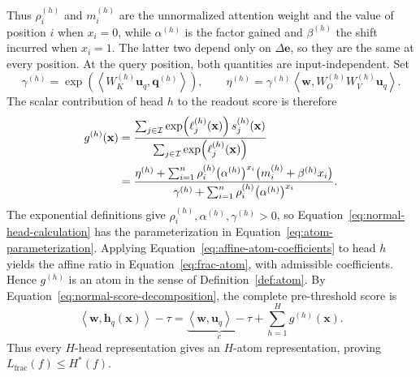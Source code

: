 \documentclass{article}
\theoremstyle{definition}
\theoremstyle{plain}
\newcommand{\hstar}{H^{\ast}}
\begin{document}
Thus $\rho_i^{(h)}$ and $m_i^{(h)}$ are the unnormalized attention weight and the value of position $i$ when $x_i=0$, while $\alpha^{(h)}$ is the factor gained and $\beta^{(h)}$ the shift incurred when $x_i=1$. The latter two depend only on $\Delta\mathbf{e}$, so they are the same at every position. At the query position, both quantities are input-independent. Set
\begin{equation}
\gamma^{(h)}
=\exp\!\left(\left\langle W_K^{(h)}\mathbf{u}_q,\mathbf{q}^{(h)}\right\rangle\right),
\qquad
\eta^{(h)}
=\gamma^{(h)}
\left\langle\mathbf{w},W_O^{(h)}W_V^{(h)}\mathbf{u}_q\right\rangle.
\label{eq:normal-query-parameters}
\end{equation}
The scalar contribution of head $h$ to the readout score is therefore
\begin{align}
g^{(h)}(\mathbf{x})
&=\frac{\sum_{j\in\mathcal{I}}
\exp\!\left(\ell_j^{(h)}(\mathbf{x})\right)s_j^{(h)}(\mathbf{x})}
{\sum_{j\in\mathcal{I}}\exp\!\left(\ell_j^{(h)}(\mathbf{x})\right)}
\notag\\
&=\frac{\eta^{(h)}+\sum_{i=1}^{n}\rho_i^{(h)}
\bigl(\alpha^{(h)}\bigr)^{x_i}
\bigl(m_i^{(h)}+\beta^{(h)}x_i\bigr)}
{\gamma^{(h)}+\sum_{i=1}^{n}\rho_i^{(h)}
\bigl(\alpha^{(h)}\bigr)^{x_i}}.
\label{eq:normal-head-calculation}
\end{align}
The exponential definitions give $\rho_i^{(h)},\alpha^{(h)},\gamma^{(h)}>0$, so Equation~\eqref{eq:normal-head-calculation} has the parameterization in Equation~\eqref{eq:atom-parameterization}. Applying Equation~\eqref{eq:affine-atom-coefficients} to head $h$ yields the affine ratio in Equation~\eqref{eq:frac-atom}, with admissible coefficients. Hence $g^{(h)}$ is an atom in the sense of Definition~\ref{def:atom}. By Equation~\eqref{eq:normal-score-decomposition}, the complete pre-threshold score is
\begin{equation}
\left\langle\mathbf{w},\mathbf{h}_q(\mathbf{x})\right\rangle-\tau
=\underbrace{\left\langle\mathbf{w},\mathbf{u}_q\right\rangle-\tau}_{c}
+\sum_{h=1}^{H}g^{(h)}(\mathbf{x}).
\end{equation}
Thus every $H$-head representation gives an $H$-atom representation, proving $L_{\mathrm{frac}}(f)\leq\hstar(f)$.
\end{document}
